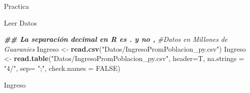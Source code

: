 \documentclass[
  ignorenonframetext,
]{beamer}
\newenvironment{Shaded}{\begin{snugshade}}{\end{snugshade}}
\newcommand{\AttributeTok}[1]{\textcolor[rgb]{0.13,0.29,0.53}{#1}}
\newcommand{\CommentTok}[1]{\textcolor[rgb]{0.56,0.35,0.01}{\textit{#1}}}
\newcommand{\ConstantTok}[1]{\textcolor[rgb]{0.56,0.35,0.01}{#1}}
\newcommand{\DocumentationTok}[1]{\textcolor[rgb]{0.56,0.35,0.01}{\textbf{\textit{#1}}}}
\newcommand{\FunctionTok}[1]{\textcolor[rgb]{0.13,0.29,0.53}{\textbf{#1}}}
\newcommand{\NormalTok}[1]{#1}
\newcommand{\OtherTok}[1]{\textcolor[rgb]{0.56,0.35,0.01}{#1}}
\newcommand{\StringTok}[1]{\textcolor[rgb]{0.31,0.60,0.02}{#1}}
\begin{document}
\begin{frame}[fragile]{Practica}
\protect\hypertarget{practica}{}
\begin{block}{Leer Datos}
\protect\hypertarget{leer-datos}{}
\begin{Shaded}
\begin{Highlighting}[]
\DocumentationTok{\#\# La separación decimal en R es . y no ,}
\CommentTok{\#Datos en Millones de Guaranies}
\NormalTok{Ingreso }\OtherTok{\textless{}{-}} \FunctionTok{read.csv}\NormalTok{(}\StringTok{"Datos/IngresoPromPoblacion\_py.csv"}\NormalTok{)}
\NormalTok{Ingreso }\OtherTok{\textless{}{-}} \FunctionTok{read.table}\NormalTok{(}\StringTok{"Datos/IngresoPromPoblacion\_py.csv"}\NormalTok{, }\AttributeTok{header=}\NormalTok{T,}
                    \AttributeTok{na.strings =} \StringTok{"4/"}\NormalTok{, }\AttributeTok{sep=} \StringTok{";"}\NormalTok{, }\AttributeTok{check.names =} \ConstantTok{FALSE}\NormalTok{)}

\NormalTok{Ingreso}
\end{Highlighting}
\end{Shaded}


\end{block}
\end{frame}
\end{document}
